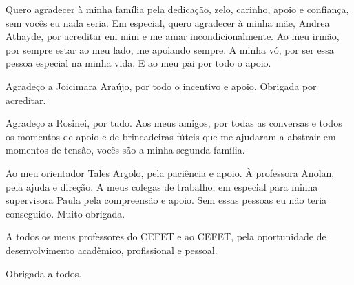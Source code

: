 %
%

\begin{agradecimentos}

Quero agradecer à minha família pela dedicação, zelo, carinho, apoio e confiança, sem vocês eu nada seria. Em especial, quero agradecer à minha mãe, Andrea Athayde, por acreditar em mim e me amar incondicionalmente. Ao meu irmão, por sempre estar ao meu lado, me apoiando sempre. A minha vó, por ser essa pessoa especial na minha vida. E ao meu pai por todo o apoio.

Agradeço a Joicimara Araújo, por todo o incentivo e apoio. Obrigada por acreditar.

Agradeço a Rosinei, por tudo. Aos meus amigos, por todas as conversas e todos os momentos de apoio e de brincadeiras fúteis que me ajudaram a abstrair em momentos de tensão, vocês são a minha segunda família. 

Ao meu orientador Tales Argolo, pela paciência e apoio. À professora Anolan, pela ajuda e direção. A meus colegas de trabalho, em especial para minha supervisora Paula pela compreensão e apoio. Sem essas pessoas eu não teria conseguido. Muito obrigada.

A todos os meus professores do CEFET e ao CEFET, pela oportunidade de desenvolvimento acadêmico, profissional e pessoal.

Obrigada a todos.   
\end{agradecimentos}
